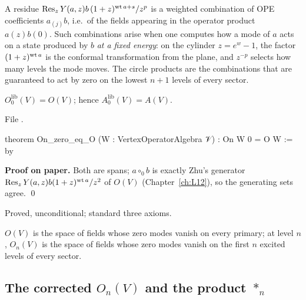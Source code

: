 \begin{physics}
A residue $\operatorname{Res}_zY(a,z)b\,(1+z)^{\operatorname{wt} a+s}/z^p$ is a weighted combination of OPE coefficients $a_{(j)}b$, i.e.\ of the fields
appearing in the operator product $a(z)b(0)$. Such combinations arise when one computes how a mode of $a$ acts on a state
produced by $b$ \emph{at a fixed energy}: on the cylinder $z = e^{w}-1$, the factor $(1+z)^{\operatorname{wt} a}$ is the conformal
transformation from the plane, and $z^{-p}$ selects how many levels the mode moves. The circle products are the combinations that
are guaranteed to act by zero on the lowest $n+1$ levels of every sector.
\end{physics}

\begin{theorem}[$O_0 = O$]\label{l13:thm:On0}
$O_0^{\mathrm{lib}}(V) = O(V)$; hence $A_0^{\mathrm{lib}}(V) = A(V)$.
\end{theorem}
\noindent File .
\begin{leancode}
theorem On_zero_eq_O (W : VertexOperatorAlgebra 𝒱) : On W 0 = O W := by
\end{leancode}
\textbf{Proof on paper.} Both are spans; $a\circ_0b$ is exactly Zhu's generator $\operatorname{Res}_zY(a,z)b(1+z)^{\operatorname{wt} a}/z^2$ of $O(V)$
(Chapter~\ref{ch:L12}), so the generating sets agree. \qed

\begin{status}
Proved, unconditional; standard three axioms.
\end{status}

\begin{physics}
$O(V)$ is the space of fields whose zero modes vanish on every primary; at level $n$, $O_n(V)$ is the space of fields
whose zero modes vanish on the first $n$ excited levels of every sector.
\end{physics}

\subsection{The corrected \texorpdfstring{$O_n(V)$}{O\_n(V)} and the product \texorpdfstring{$*_n$}{*\_n}}


